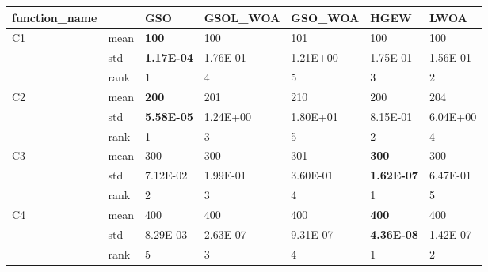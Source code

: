 \begin{table}[]
\centering
\begin{tabular}{|l|l|l|l|l|l|l|}
\hline
function\_name       &      & GSO               & GSOL\_WOA         & GSO\_WOA          & HGEW              & LWOA              \\ \hline
\multirow{3}{*}{C1}  & mean & \textbf{100}      & 100               & 101               & 100               & 100               \\ \cline{2-7} 
                     & std  & \textbf{1.17E-04} & 1.76E-01          & 1.21E+00          & 1.75E-01          & 1.56E-01          \\ \cline{2-7} 
                     & rank & 1                 & 4                 & 5                 & 3                 & 2                 \\ \hline
\multirow{3}{*}{C2}  & mean & \textbf{200}      & 201               & 210               & 200               & 204               \\ \cline{2-7} 
                     & std  & \textbf{5.58E-05} & 1.24E+00          & 1.80E+01          & 8.15E-01          & 6.04E+00          \\ \cline{2-7} 
                     & rank & 1                 & 3                 & 5                 & 2                 & 4                 \\ \hline
\multirow{3}{*}{C3}  & mean & 300               & 300               & 301               & \textbf{300}      & 300               \\ \cline{2-7} 
                     & std  & 7.12E-02          & 1.99E-01          & 3.60E-01          & \textbf{1.62E-07} & 6.47E-01          \\ \cline{2-7} 
                     & rank & 2                 & 3                 & 4                 & 1                 & 5                 \\ \hline
\multirow{3}{*}{C4}  & mean & 400               & 400               & 400               & \textbf{400}      & 400               \\ \cline{2-7} 
                     & std  & 8.29E-03          & 2.63E-07          & 9.31E-07          & \textbf{4.36E-08} & 1.42E-07          \\ \cline{2-7} 
                     & rank & 5                 & 3                 & 4                 & 1                 & 2                 \\ \hline

\end{tabular}
\end{table}
